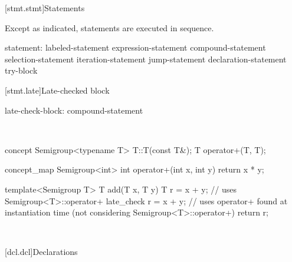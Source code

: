 \documentclass[american]{book}
\begin{document}
[stmt.stmt]{Statements}

\begin{paras}

\pnum
{}%
Except as indicated, statements are executed in sequence.
%

\begin{bnf}
%
statement:\br
    labeled-statement\br
    expression-statement\br
    compound-statement\br
    selection-statement\br
    iteration-statement\br
    jump-statement\br
    declaration-statement\br
    try-block\br
\end{bnf}

\color{addclr}
\setcounter{section}{8}
[stmt.late]{Late-checked block}

\pnum
{} 
  
\begin{bnf}
late-check-block:\br
     compound-statement
\end{bnf}

\pnum
\enterexample\
\begin{codeblock}
concept Semigroup<typename T> {
  T::T(const T&);
  T operator+(T, T);
}

concept_map Semigroup<int> {
  int operator+(int x, int y) { return x * y; }
}

template<Semigroup T> 
T add(T x, T y) { 
  T r = x + y; // uses Semigroup<T>::operator+
  late_check {
    r = x + y; // uses operator+ found at instantiation time (not considering Semigroup<T>::operator+)
  }
  return r;
}
\end{codeblock}
\exitexample\
\color{black}

\end{paras}

[dcl.dcl]{Declarations}
\end{document}
